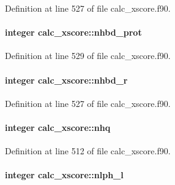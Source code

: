 Definition at line 527 of file calc\-\_\-xscore.\-f90.

\hypertarget{classcalc__xscore_a853d005c7ab5d762919b55604d83a274}{
\paragraph[{nhbd\-\_\-prot}]{\setlength{\rightskip}{0pt plus 5cm}integer calc\-\_\-xscore\-::nhbd\-\_\-prot}}\label{classcalc__xscore_a853d005c7ab5d762919b55604d83a274}


Definition at line 529 of file calc\-\_\-xscore.\-f90.

\hypertarget{classcalc__xscore_a0f6eab8620160599c3b957f08b235396}{
\paragraph[{nhbd\-\_\-r}]{\setlength{\rightskip}{0pt plus 5cm}integer calc\-\_\-xscore\-::nhbd\-\_\-r}}\label{classcalc__xscore_a0f6eab8620160599c3b957f08b235396}


Definition at line 527 of file calc\-\_\-xscore.\-f90.

\hypertarget{classcalc__xscore_a18bf961e2574d67d3cb2eac738792ac6}{
\paragraph[{nhq}]{\setlength{\rightskip}{0pt plus 5cm}integer calc\-\_\-xscore\-::nhq}}\label{classcalc__xscore_a18bf961e2574d67d3cb2eac738792ac6}


Definition at line 512 of file calc\-\_\-xscore.\-f90.

\hypertarget{classcalc__xscore_ab072817178ff012a99fdd31d4537e28e}{
\paragraph[{nlph\-\_\-l}]{\setlength{\rightskip}{0pt plus 5cm}integer calc\-\_\-xscore\-::nlph\-\_\-l}}\label{classcalc__xscore_ab072817178ff012a99fdd31d4537e28e}


